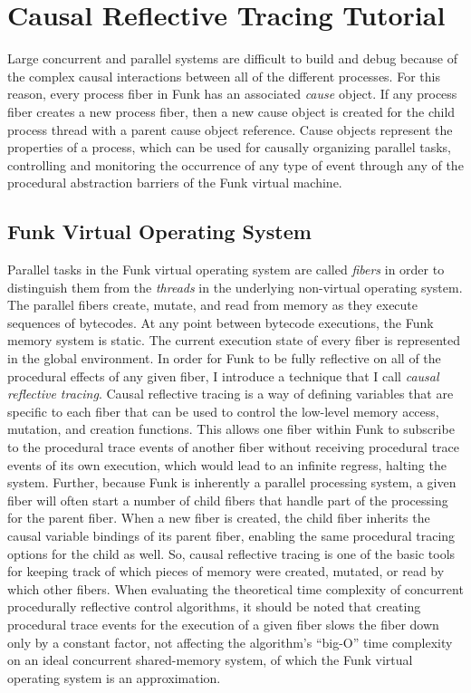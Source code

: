 \chapter{Causal Reflective Tracing Tutorial}
\label{appendix:causal_reflective_tracing_tutorial}

Large concurrent and parallel systems are difficult to build and debug
because of the complex causal interactions between all of the
different processes.  For this reason, every process fiber in Funk has
an associated \emph{cause} object.  If any process fiber creates a new
process fiber, then a new cause object is created for the child
process thread with a parent cause object reference.  Cause objects
represent the properties of a process, which can be used for causally
organizing parallel tasks, controlling and monitoring the occurrence
of any type of event through any of the procedural abstraction
barriers of the Funk virtual machine.

\section{Funk Virtual Operating System}

Parallel tasks in the Funk virtual operating system are called
\emph{fibers} in order to distinguish them from the \emph{threads} in
the underlying non-virtual operating system.  The parallel fibers
create, mutate, and read from memory as they execute sequences of
bytecodes.  At any point between bytecode executions, the Funk memory
system is static.  The current execution state of every fiber is
represented in the global environment.  In order for Funk to be fully
reflective on all of the procedural effects of any given fiber, I
introduce a technique that I call \emph{causal reflective tracing}.
Causal reflective tracing is a way of defining variables that are
specific to each fiber that can be used to control the low-level
memory access, mutation, and creation functions.  This allows one
fiber within Funk to subscribe to the procedural trace events of
another fiber without receiving procedural trace events of its own
execution, which would lead to an infinite regress, halting the
system.  Further, because Funk is inherently a parallel processing
system, a given fiber will often start a number of child fibers that
handle part of the processing for the parent fiber.  When a new fiber
is created, the child fiber inherits the causal variable bindings of
its parent fiber, enabling the same procedural tracing options for the
child as well.  So, causal reflective tracing is one of the basic
tools for keeping track of which pieces of memory were created,
mutated, or read by which other fibers.  When evaluating the
theoretical time complexity of concurrent procedurally reflective
control algorithms, it should be noted that creating procedural trace
events for the execution of a given fiber slows the fiber down only by
a constant factor, not affecting the algorithm's ``big-O'' time
complexity on an ideal concurrent shared-memory system, of which the
Funk virtual operating system is an approximation.

